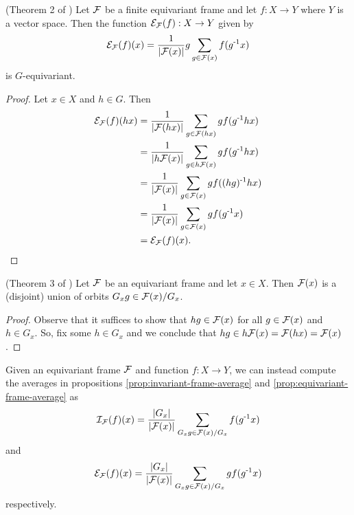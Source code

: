 \begin{proposition}\label{prop:equivariant-frame-average}
    (Theorem 2 of \cite{puny2022frameaveraginginvariantequivariant})
    Let $\mathcal{F}$ be a finite equivariant frame and let $f : X \to Y$ where $Y$ is a vector space.
    Then the function $\mathcal{E}_{\mathcal{F}} (f) : X \to Y$ given by
    \[
        \mathcal{E}_{\mathcal{F}} (f) (x) = \frac{1}{\left| \mathcal{F}(x) \right|} g\sum_{g \in \mathcal{F}(x)} f(g^{\text{-}1} x)
    \]
    is $G$-equivariant.
    \begin{proof}
        Let $x \in X$ and $h \in G$.
        Then
        \begin{align*}
            \mathcal{E}_{\mathcal{F}} (f) (hx)
            &= \frac{1}{\left| \mathcal{F}(hx) \right|} \sum_{g \in \mathcal{F}(hx)} gf(g^{\text{-}1} hx) \\
            &= \frac{1}{\left| h\mathcal{F}(x) \right|} \sum_{g \in h\mathcal{F}(x)} gf(g^{\text{-}1} hx) \\
            &= \frac{1}{\left| \mathcal{F}(x) \right|} \sum_{g \in \mathcal{F}(x)} gf((hg)^{\text{-}1} hx) \\
            &= \frac{1}{\left| \mathcal{F}(x) \right|} \sum_{g \in \mathcal{F}(x)} gf(g^{\text{-}1} x) \\
            &= \mathcal{E}_{\mathcal{F}} (f) (x).
        \end{align*}
    \end{proof}
\end{proposition}

\begin{proposition}\label{prop:frame-is-orbit-union}
    (Theorem 3 of \cite{puny2022frameaveraginginvariantequivariant})
    Let $\mathcal{F}$ be an equivariant frame and let $x \in X$.
    Then $\mathcal{F}(x)$ is a (disjoint) union of orbits $G_x g \in \mathcal{F}(x) / G_x$.
    \begin{proof}
        Observe that it suffices to show that $hg \in \mathcal{F}(x)$ for all $g \in \mathcal{F}(x)$ and $h \in G_x$.
        So, fix some $h \in G_x$ and we conclude that $hg \in h\mathcal{F}(x) = \mathcal{F}(hx) = \mathcal{F}(x)$.
    \end{proof}
\end{proposition}

\begin{corollary}
    Given an equivariant frame $\mathcal{F}$ and function $f : X \to Y$, we can instead compute the averages in propositions \ref{prop:invariant-frame-average} and \ref{prop:equivariant-frame-average} as
    \[
        \mathcal{I}_{\mathcal{F}} (f) (x) = \frac{\left| G_x \right|}{\left| \mathcal{F}(x) \right|} \sum_{G_x g \in \mathcal{F}(x) / G_x} f(g^{\text{-}1}x)
    \]
    and
    \[
        \mathcal{E}_{\mathcal{F}} (f) (x) = \frac{\left| G_x \right|}{\left| \mathcal{F}(x) \right|} \sum_{G_x g \in \mathcal{F}(x) / G_x} gf(g^{\text{-}1}x)
    \]
    respectively.
\end{corollary}

